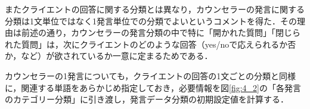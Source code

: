 \documentclass[shuuron]{kuee}
\begin{document}

またクライエントの回答に関する分類とは異なり，カウンセラーの発言に関する分類は1文単位ではなく1発言単位での分類でよいというコメントを得た．その理由は前述の通り，カウンセラーの発言分類の中で特に「開かれた質問」「閉じられた質問」は，次にクライエントのどのような回答（yes/noで応えられるか否か，など）が欲されているか一意に定まるためである．


カウンセラーの1発言についても，クライエントの回答の1文ごとの分類と同様に，関連する単語をあらかじめ指定しておき，必要情報を図\ref{fig:4_2}の「各発言のカテゴリー分類」に引き渡し，発言データ分類の初期設定値を計算する．




\end{document}
